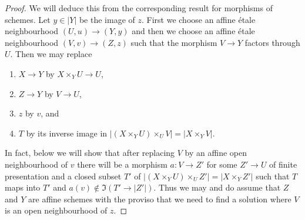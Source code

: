 \begin{proof}
We will deduce this from the corresponding result for morphisms of schemes.
Let $y \in |Y|$ be the image of $z$. First we choose an affine \'etale
neighbourhood $(U, u) \to (Y, y)$ and then we choose an affine \'etale
neighbourhood $(V, v) \to (Z, z)$ such that the morphism $V \to Y$
factors through $U$. Then we may replace
\begin{enumerate}
\item $X \to Y$ by $X \times_Y U \to U$,
\item $Z \to Y$ by $V \to U$,
\item $z$ by $v$, and
\item $T$ by its inverse image in
$|(X \times_Y U) \times_U V| = |X \times_Y V|$.
\end{enumerate}
In fact, below we will show that after replacing $V$ by an affine
open neighbourhood of $v$ there will be a morphism $a : V \to Z'$ for
some $Z' \to U$ of finite presentation and a closed subset $T'$
of $|(X \times_Y U) \times_U Z'| = |X \times_Y Z'|$ such that
$T$ maps into $T'$ and $a(v) \not \in \Im(T' \to |Z'|)$.
Thus we may and do assume that $Z$ and $Y$ are affine schemes
with the proviso that we need to find a solution where $V$
is an open neighbourhood of $z$.


\end{proof}
